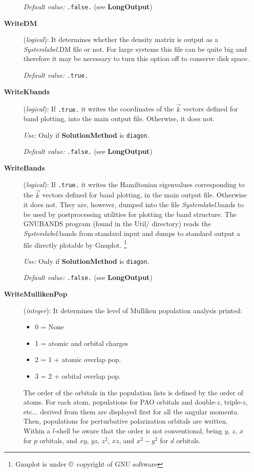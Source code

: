 \documentclass[11pt]{article}
\begin{document}
\begin{description}
{\it Default value:} {\tt .false.} (see {\bf LongOutput})

\item[{\bf WriteDM}] ({\it logical}): 
 It determines whether the density matrix
is output as a {\it Systemlabel}.DM file or not. For large systems
this file can be quite big and therefore it may be necessary to turn
this option off to conserve disk space.

{\it Default value:} {\tt .true.}

\item[{\bf WriteKbands}] ({\it logical}):
If {\tt .true.} it writes the coordinates of the $\vec k$ vectors
defined for band plotting, into the main output file.
Otherwise, it does not.

{\it Use:} Only if {\bf SolutionMethod} is {\tt diagon}.

{\it Default value:} {\tt .false.} (see {\bf LongOutput})


\item[{\bf WriteBands}] ({\it logical}):  If {\tt .true.} it writes
the Hamiltonian eigenvalues corresponding to the $\vec k$ vectors
defined for band plotting, in the main output file.  Otherwise it does
not. They are, however, dumped into the file {\it Systemlabel}.bands
to be used by postprocessing utilities for plotting the band
structure. The GNUBANDS program
(found in the Util/ directory) reads the {\it Systemlabel}.bands from
standard input and dumps to standard output a file directly plotable
by {\sc Gnuplot}.
\footnote{{\sc Gnuplot} is under \copyright\ copyright of GNU software}

{\it Use:} Only if {\bf SolutionMethod} is {\tt diagon}.
 
{\it Default value:} {\tt .false.} (see {\bf LongOutput})


\item[{\bf WriteMullikenPop}] ({\it integer}): 
It determines the level of Mulliken population analysis printed:
\begin{itemize}
\item 0 = None
\item 1 = atomic and orbital charges
\item 2 = 1 + atomic overlap pop.
\item 3 = 2 + orbital overlap pop.
\end{itemize}
The order of the orbitals in the population lists is defined
by the order of atoms. For each atom, populations for PAO orbitals and
double-$z$, triple-$z$, etc... derived from them are displayed first for 
all the angular momenta. Then, populations for perturbative polarization
orbitals are written.
Within a $l$-shell be aware that the order is not
conventional, being $y$, $z$, $x$ for $p$ orbitals, and
$xy$, $yz$, $z^2$, $xz$, and $x^2-y^2$ for $d$ orbitals. 


\end{description}
\end{document}
